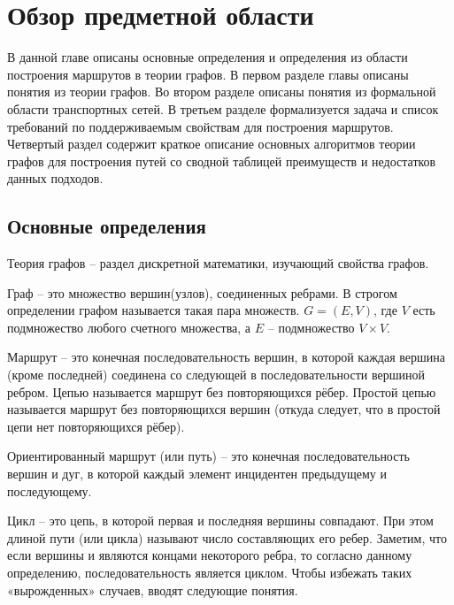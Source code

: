 \chapter{Обзор предметной области}
В данной главе описаны основные определения и определения из области построения маршрутов в теории графов. В первом разделе главы описаны понятия из теории графов. Во втором разделе описаны понятия из формальной области транспортных сетей. В третьем разделе формализуется задача и список требований по поддерживаемым свойствам для построения маршрутов. Четвертый раздел содержит краткое описание основных алгоритмов теории графов для построения путей со сводной таблицей преимуществ и недостатков данных подходов.

\section{Основные определения}
\begin{definition}
Теория графов -- раздел дискретной математики, изучающий свойства графов.
\end{definition}

\begin{definition}
Граф -- это множество вершин(узлов), соединенных ребрами. В строгом определении графом называется такая пара множеств. $G=(E, V)$, где $V$ есть подмножество любого счетного множества, а $E$ -- подмножество $V \times V$.
\end{definition}

\begin{definition}
Маршрут -- это конечная последовательность вершин, в которой каждая вершина (кроме последней) соединена со следующей в последовательности вершиной ребром. Цепью называется маршрут без повторяющихся рёбер. Простой цепью называется маршрут без повторяющихся вершин (откуда следует, что в простой цепи нет повторяющихся рёбер).
\end{definition}

\begin{definition}
Ориентированный маршрут (или путь) -- это конечная последовательность вершин и дуг, в которой каждый элемент инцидентен предыдущему и последующему.
\end{definition}

\begin{definition}
Цикл -- это цепь, в которой первая и последняя вершины совпадают. При этом длиной пути (или цикла) называют число составляющих его ребер. Заметим, что если вершины и являются концами некоторого ребра, то согласно данному определению, последовательность является циклом. Чтобы избежать таких «вырожденных» случаев, вводят следующие понятия.
\end{definition}

